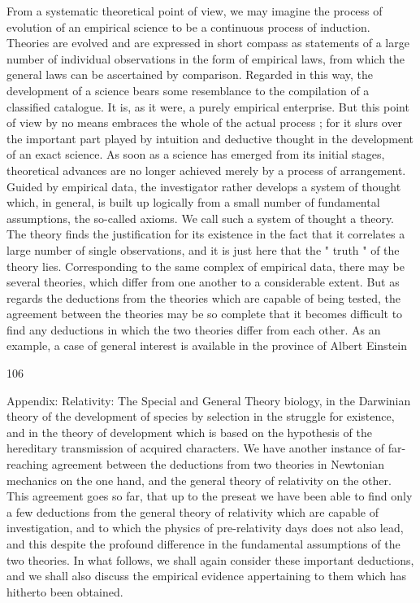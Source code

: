 \documentclass{article}
\begin{document}
From a systematic theoretical point of view, we may imagine the process of evolution of
an empirical science to be a continuous process of induction. Theories are evolved and are
expressed in short compass as statements of a large number of individual observations in
the form of empirical laws, from which the general laws can be ascertained by comparison.
Regarded in this way, the development of a science bears some resemblance to the
compilation of a classified catalogue. It is, as it were, a purely empirical enterprise.
But this point of view by no means embraces the whole of the actual process ; for it slurs
over the important part played by intuition and deductive thought in the development of an
exact science. As soon as a science has emerged from its initial stages, theoretical advances
are no longer achieved merely by a process of arrangement. Guided by empirical data, the
investigator rather develops a system of thought which, in general, is built up logically from
a small number of fundamental assumptions, the so-called axioms. We call such a system of
thought a theory. The theory finds the justification for its existence in the fact that it
correlates a large number of single observations, and it is just here that the " truth " of the
theory lies.
Corresponding to the same complex of empirical data, there may be several theories,
which differ from one another to a considerable extent. But as regards the deductions from
the theories which are capable of being tested, the agreement between the theories may be
so complete that it becomes difficult to find any deductions in which the two theories differ
from each other. As an example, a case of general interest is available in the province of
Albert Einstein

106

Appendix: Relativity: The Special and General Theory
biology, in the Darwinian theory of the development of species by selection in the struggle
for existence, and in the theory of development which is based on the hypothesis of the
hereditary transmission of acquired characters.
We have another instance of far-reaching agreement between the deductions from two
theories in Newtonian mechanics on the one hand, and the general theory of relativity on
the other. This agreement goes so far, that up to the preseat we have been able to find only a
few deductions from the general theory of relativity which are capable of investigation, and
to which the physics of pre-relativity days does not also lead, and this despite the profound
difference in the fundamental assumptions of the two theories. In what follows, we shall
again consider these important deductions, and we shall also discuss the empirical evidence
appertaining to them which has hitherto been obtained.
\end{document}
